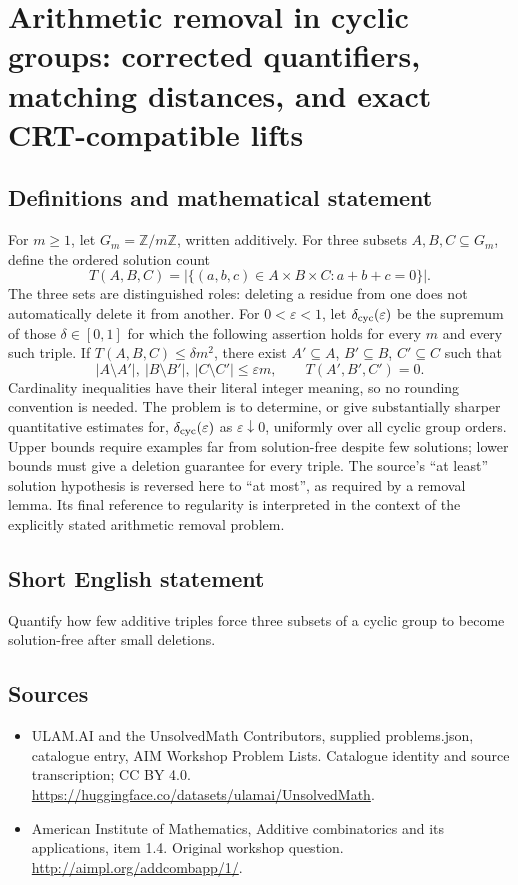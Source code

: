 \documentclass[11pt,a4paper]{article}
\begin{document}
\section*{Arithmetic removal in cyclic groups: corrected quantifiers, matching distances, and exact CRT-compatible lifts}\label{statement}

\subsection{Definitions and mathematical statement}
For $m\geq1$, let $G_m=\mathbb Z/m\mathbb Z$, written additively.
For three subsets $A,B,C\subseteq G_m$, define the ordered solution count
\[
 T(A,B,C)=|\{(a,b,c)\in A\times B\times C:a+b+c=0\}|.
\]
The three sets are distinguished roles: deleting a residue from one does not automatically delete it from another.
For $0<\varepsilon<1$, let $\delta_{\rm cyc}(\varepsilon)$ be the supremum of those $\delta\in[0,1]$ for which the following assertion holds for every $m$ and every such triple.
If $T(A,B,C)\leq\delta m^2$, there exist $A'\subseteq A$, $B'\subseteq B$, $C'\subseteq C$ such that
\[
 |A\setminus A'|,\ |B\setminus B'|,\ |C\setminus C'|
 \leq\varepsilon m,
 \qquad T(A',B',C')=0.
\]
Cardinality inequalities have their literal integer meaning, so no rounding convention is needed.
The problem is to determine, or give substantially sharper quantitative estimates for, $\delta_{\rm cyc}(\varepsilon)$ as $\varepsilon\downarrow0$, uniformly over all cyclic group orders.
Upper bounds require examples far from solution-free despite few solutions; lower bounds must give a deletion guarantee for every triple.
The source's ``at least'' solution hypothesis is reversed here to ``at most'', as required by a removal lemma.
Its final reference to regularity is interpreted in the context of the explicitly stated arithmetic removal problem.
\subsection{Short English statement}
Quantify how few additive triples force three subsets of a cyclic group to become solution-free after small deletions.
\subsection{Sources}
\begin{itemize}
\item[S1] ULAM.AI and the UnsolvedMath Contributors, supplied problems.json, catalogue entry, AIM Workshop Problem Lists. Catalogue identity and source transcription; CC BY 4.0.
\url{https://huggingface.co/datasets/ulamai/UnsolvedMath}.
\item[S2] American Institute of Mathematics, Additive combinatorics and its applications, item 1.4. Original workshop question.
\url{http://aimpl.org/addcombapp/1/}.
\end{itemize}
\end{document}
